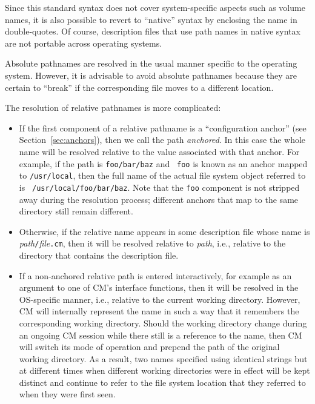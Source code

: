 \documentclass{article}
\begin{document}
Since this standard syntax does not cover system-specific aspects such
as volume names, it is also possible to revert to ``native'' syntax by
enclosing the name in double-quotes.  Of course, description files
that use path names in native syntax are not portable across operating
systems.

Absolute pathnames are resolved in the usual manner specific to the
operating system.  However, it is advisable to avoid absolute
pathnames because they are certain to ``break'' if the corresponding
file moves to a different location.

The resolution of relative pathnames is more complicated:

\begin{itemize}
\item If the first component of a relative pathname is a
``configuration anchor'' (see Section~\ref{sec:anchors}), then we call
the path {\em anchored}.  In this case the
whole name will be resolved relative to the value associated with that
anchor.  For example, if the path is {\tt foo/bar/baz} and {\tt
foo} is known as an anchor mapped to {\tt /usr/local}, then the
full name of the actual file system object referred to is {\tt
/usr/local/foo/bar/baz}. Note that the {\tt foo} component is not
stripped away during the resolution process; different anchors that
map to the same directory still remain different.
\item Otherwise, if the relative name appears in some description file
whose name is {\it path}{\tt /}{\it file}{\tt .cm}, then it will be
resolved relative to {\it path}, i.e., relative to the directory that
contains the description file.
\item If a non-anchored relative path is entered interactively, for
example as an argument to one of CM's interface functions, then it
will be resolved in the OS-specific manner, i.e., relative to the
current working directory.  However, CM will internally represent the
name in such a way that it remembers the corresponding working
directory.  Should the working directory change during an ongoing CM
session while there still is a reference to the name, then CM will
switch its mode of operation and prepend the path of the original
working directory. As a result, two names specified using identical
strings but at different times when different working directories were
in effect will be kept distinct and continue to refer to the file
system location that they referred to when they were first seen.
\end{itemize}
\end{document}
